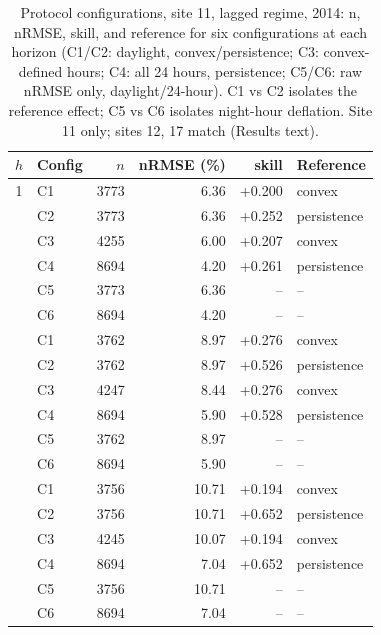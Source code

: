 \begin{table}[t]
  \centering
  \small
  \caption{Protocol configurations, site 11, lagged regime, 2014: n, nRMSE, skill, and reference for six configurations at each horizon (C1/C2: daylight, convex/persistence; C3: convex-defined hours; C4: all 24 hours, persistence; C5/C6: raw nRMSE only, daylight/24-hour). C1 vs C2 isolates the reference effect; C5 vs C6 isolates night-hour deflation. Site 11 only; sites 12, 17 match (Results text).}
  \label{tab:T4}
  \begin{tabular}{cl rrrl}
    \toprule
    $h$ & Config & $n$ & nRMSE (\%) & skill & Reference \\
    \midrule
    1 & C1 & 3773 & 6.36 & +0.200 & convex \\
     & C2 & 3773 & 6.36 & +0.252 & persistence \\
     & C3 & 4255 & 6.00 & +0.207 & convex \\
     & C4 & 8694 & 4.20 & +0.261 & persistence \\
     & C5 & 3773 & 6.36 & -- & -- \\
     & C6 & 8694 & 4.20 & -- & -- \\
    \addlinespace
    3 & C1 & 3762 & 8.97 & +0.276 & convex \\
     & C2 & 3762 & 8.97 & +0.526 & persistence \\
     & C3 & 4247 & 8.44 & +0.276 & convex \\
     & C4 & 8694 & 5.90 & +0.528 & persistence \\
     & C5 & 3762 & 8.97 & -- & -- \\
     & C6 & 8694 & 5.90 & -- & -- \\
    \addlinespace
    6 & C1 & 3756 & 10.71 & +0.194 & convex \\
     & C2 & 3756 & 10.71 & +0.652 & persistence \\
     & C3 & 4245 & 10.07 & +0.194 & convex \\
     & C4 & 8694 & 7.04 & +0.652 & persistence \\
     & C5 & 3756 & 10.71 & -- & -- \\
     & C6 & 8694 & 7.04 & -- & -- \\
    \bottomrule
  \end{tabular}
\end{table}
